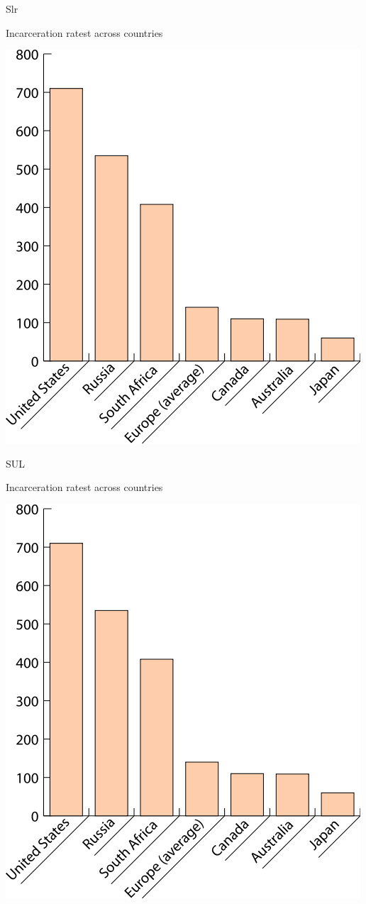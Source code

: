 \begin{chart}{S}{lr}
\caption{Incarceration ratest across countries}
\label{chart:incarceration}
\includegraphics[width=\chartwidth,height=\chartheight]{incarceration}  
\end{chart}

\begin{chart}{S}{UL}
\caption{Incarceration ratest across countries}
\label{chart:incarceration}
\includegraphics[width=\chartwidth,height=\chartheight]{incarceration}  
\end{chart}

